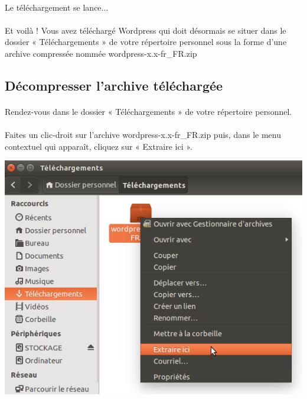 \documentclass[10pt,a4paper]{article}
\begin{document}
\paragraph{}Le téléchargement se lance...
\paragraph{}Et voilà ! Vous avez téléchargé Wordpress qui doit désormais se situer dans le dossier « Téléchargements » de votre répertoire personnel sous la forme d'une archive compressée nommée wordpress-x.x-fr\_FR.zip
\subsection{Décompresser l'archive téléchargée}
\paragraph{}Rendez-vous dans le dossier « Téléchargements » de votre répertoire personnel.
\paragraph{}Faites un clic-droit sur l'archive wordpress-x.x-fr\_FR.zip puis, dans le menu contextuel qui apparaît, cliquez sur « Extraire ici ».
\begin{center}
\includegraphics[scale=0.5]{img/0004.png}
\end{center}
\end{document}
